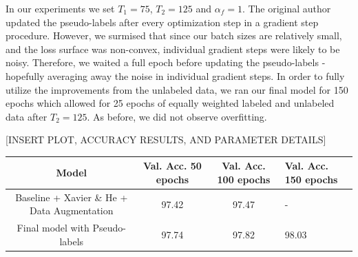 \documentclass[a4paper]{article}
\begin{document}
\begin{enumerate}
{\newline
\newline
In our experiments we set $T_1 = 75$, $T_2 = 125$ and $\alpha_f = 1$. The original author updated the pseudo-labels after every optimization step in a gradient step procedure. However, we surmised that since our batch sizes are relatively small, and the loss surface was non-convex, individual gradient steps were likely to be noisy. Therefore, we waited a full epoch before updating the pseudo-labels - hopefully averaging away the noise in individual gradient steps. 
\newline
\newline
In order to fully utilize the improvements from the unlabeled data, we ran our final model for 150 epochs which allowed for 25 epochs of equally weighted labeled and unlabeled data after $T_2 = 125$. As before, we did not observe overfitting.

[INSERT PLOT, ACCURACY RESULTS, AND PARAMETER DETAILS]

\begin{center}
\begin{tabular}{ |c|c|c| } 
 \hline
 Model & Val. Acc. 50 epochs & Val. Acc. 100 epochs & Val. Acc. 150 epochs \\ \hline
 Baseline + Xavier \& He + Data Augmentation & 97.42 & 97.47 & - \\ 
 Final model with Pseudo-labels & 97.74 & 97.82 & 98.03
 \hline
\end{tabular}
\end{center}

}
\end{enumerate}
\end{document}
